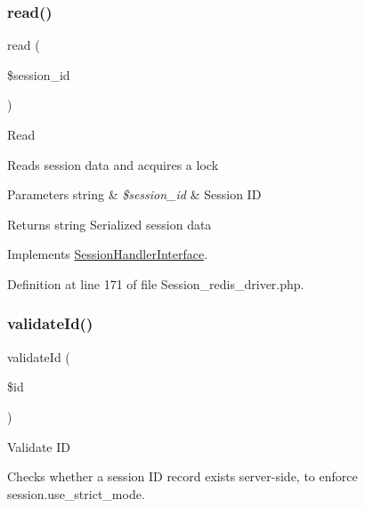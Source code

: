 \mbox{\label{class_c_i___session__redis__driver_a5bbf84ebf657be4eaccc0582377c76bf}} 
\subsubsection{\texorpdfstring{read()}{read()}}
{\footnotesize\ttfamily read (\begin{DoxyParamCaption}\item[{}]{\$session\+\_\+id }\end{DoxyParamCaption})}

Read

Reads session data and acquires a lock


\begin{DoxyParams}[1]{Parameters}
string & {\em \$session\+\_\+id} & Session ID \\
\hline
\end{DoxyParams}
\begin{DoxyReturn}{Returns}
string Serialized session data 
\end{DoxyReturn}


Implements \mbox{\hyperlink{interface_session_handler_interface_a5bbf84ebf657be4eaccc0582377c76bf}{Session\+Handler\+Interface}}.



Definition at line 171 of file Session\+\_\+redis\+\_\+driver.\+php.

\mbox{\label{class_c_i___session__redis__driver_a4a58e8f59b2accc199bbebd5ee52bc74}} 
\subsubsection{\texorpdfstring{validateId()}{validateId()}}
{\footnotesize\ttfamily validate\+Id (\begin{DoxyParamCaption}\item[{}]{\$id }\end{DoxyParamCaption})}

Validate ID

Checks whether a session ID record exists server-\/side, to enforce session.\+use\+\_\+strict\+\_\+mode.


